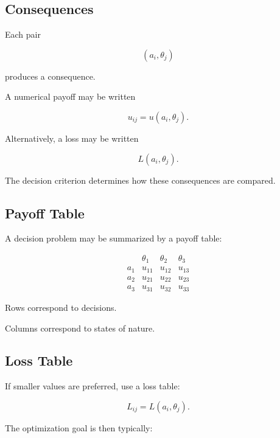 \subsection{Consequences}
\label{subsec:decision-consequences}

Each pair

\[
(a_i,\theta_j)
\]

produces a consequence.

A numerical payoff may be written

\[
\boxed{
u_{ij}
=
u(a_i,\theta_j).
}
\]

Alternatively, a loss may be written

\[
\boxed{
L(a_i,\theta_j).
}
\]

The decision criterion determines how these consequences are compared.

\subsection{Payoff Table}
\label{subsec:payoff-table}

A decision problem may be summarized by a payoff table:

\[
\begin{array}{c|ccc}
&
\theta_1
&
\theta_2
&
\theta_3
\\
\hline
a_1
&
u_{11}
&
u_{12}
&
u_{13}
\\
a_2
&
u_{21}
&
u_{22}
&
u_{23}
\\
a_3
&
u_{31}
&
u_{32}
&
u_{33}
\end{array}
\]

Rows correspond to decisions.

Columns correspond to states of nature.

\subsection{Loss Table}
\label{subsec:loss-table}

If smaller values are preferred, use a loss table:

\[
\boxed{
L_{ij}
=
L(a_i,\theta_j).
}
\]

The optimization goal is then typically:


